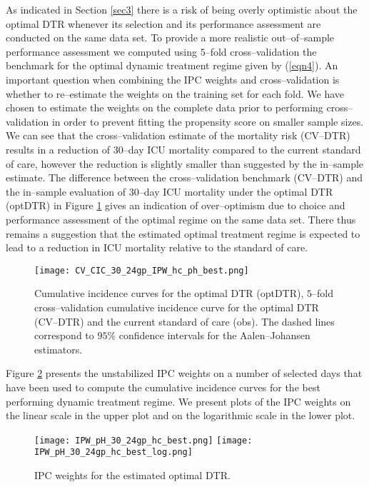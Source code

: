 \documentclass[12pt]{article}
\begin{document}
As indicated in Section \ref{sec3} there is a risk of being overly optimistic about the optimal DTR whenever its selection and its performance assessment are conducted on the same data set. To provide a more realistic out--of--sample performance assessment we computed using $5$--fold cross--validation the benchmark for the optimal dynamic treatment regime given by (\ref{eqn4}). An important question when combining the IPC weights and cross--validation is whether to re--estimate the weights on the training set for each fold. We have chosen to estimate the weights on the complete data prior to performing cross--validation in order to prevent fitting the propensity score on smaller sample sizes. We can see that the cross--validation estimate of the mortality risk (CV--DTR) results in a reduction of $30$--day ICU mortality compared to the current standard of care, however the reduction is slightly smaller than suggested by the in--sample estimate. The difference between the cross--validation benchmark (CV--DTR) and the in--sample evaluation of $30$--day ICU mortality under the optimal DTR (optDTR) in Figure \ref{figure2} gives an indication of over--optimism due to choice and performance assessment of the optimal regime on the same data set. There thus remains a suggestion that the estimated optimal treatment regime is expected to lead to a reduction in ICU mortality relative to the standard of care. 
\begin{figure}[H]
\begin{center}
\texttt{[image: CV\_CIC\_30\_24gp\_IPW\_hc\_ph\_best.png]}
\end{center}
\caption{Cumulative incidence curves for the optimal DTR (optDTR), $5$--fold cross--validation cumulative incidence curve for the optimal DTR (CV--DTR) and the current standard of care (obs). The dashed lines correspond to $95\%$ confidence intervals for the Aalen--Johansen estimators.\label{figure2}}
\end{figure}
\indent
Figure \ref{figure3} presents the unstabilized IPC weights on a number of selected days that have been used to compute the cumulative incidence curves for the best performing dynamic treatment regime. We present plots of the IPC weights on the linear scale in the upper plot and on the logarithmic scale in the lower plot. 
\begin{figure}[H]
\begin{center}
\texttt{[image: IPW\_pH\_30\_24gp\_hc\_best.png]}
\texttt{[image: IPW\_pH\_30\_24gp\_hc\_best\_log.png]}
\end{center}
\caption{IPC weights for the estimated optimal DTR.\label{figure3}}
\end{figure}
\end{document}
